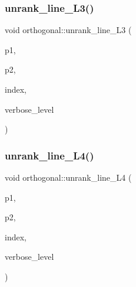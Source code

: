 \subsubsection{\texorpdfstring{unrank\+\_\+line\+\_\+\+L3()}{unrank\_line\_L3()}}
{\footnotesize\ttfamily void orthogonal\+::unrank\+\_\+line\+\_\+\+L3 (\begin{DoxyParamCaption}\item[{\mbox{\hyperlink{galois_8h_a09fddde158a3a20bd2dcadb609de11dc}{I\+NT}} \&}]{p1,  }\item[{\mbox{\hyperlink{galois_8h_a09fddde158a3a20bd2dcadb609de11dc}{I\+NT}} \&}]{p2,  }\item[{\mbox{\hyperlink{galois_8h_a09fddde158a3a20bd2dcadb609de11dc}{I\+NT}}}]{index,  }\item[{\mbox{\hyperlink{galois_8h_a09fddde158a3a20bd2dcadb609de11dc}{I\+NT}}}]{verbose\+\_\+level }\end{DoxyParamCaption})}

\mbox{\label{classorthogonal_ab207c36ebccd5b91981d678a56ffd9eb}} 
\subsubsection{\texorpdfstring{unrank\+\_\+line\+\_\+\+L4()}{unrank\_line\_L4()}}
{\footnotesize\ttfamily void orthogonal\+::unrank\+\_\+line\+\_\+\+L4 (\begin{DoxyParamCaption}\item[{\mbox{\hyperlink{galois_8h_a09fddde158a3a20bd2dcadb609de11dc}{I\+NT}} \&}]{p1,  }\item[{\mbox{\hyperlink{galois_8h_a09fddde158a3a20bd2dcadb609de11dc}{I\+NT}} \&}]{p2,  }\item[{\mbox{\hyperlink{galois_8h_a09fddde158a3a20bd2dcadb609de11dc}{I\+NT}}}]{index,  }\item[{\mbox{\hyperlink{galois_8h_a09fddde158a3a20bd2dcadb609de11dc}{I\+NT}}}]{verbose\+\_\+level }\end{DoxyParamCaption})}

\mbox{\label{classorthogonal_a64148a40b356447a00d985789ad74c82}} 
